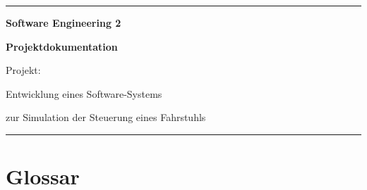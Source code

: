 

\begin{titlepage}
	\vspace*{\fill}

	\rule{\textwidth}{0.25pt}

	\vspace*{1cm}

	\begin{singlespace}
		\begin{center}	\Large	\bfseries
			Software Engineering 2
		\end{center}
	\end{singlespace}

	\vspace{1em}

	\begin{singlespace}
		\begin{center}	\Large \bfseries
		Projektdokumentation
		
		\vspace{2em}	\large
		Projekt:
		
		Entwicklung eines Software-Systems
		
		zur Simulation der Steuerung eines Fahrstuhls
		\end{center}
	\end{singlespace}

	\vspace*{5cm}

	\rule{\textwidth}{0.25pt}

	\vspace*{\fill}
\end{titlepage}


\tableofcontents






\chapter{Glossar}
\glsaddall %
\printglossary[title=Allgemeiner Glossar, toctitle=Allgemeiner Glossar, type=allg]
\printglossary[title=Projektspezifischer Glossar, toctitle=Projektspezifischer Glossar]
